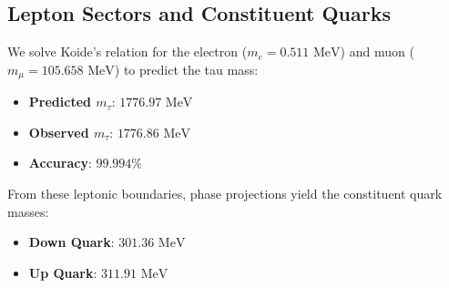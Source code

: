 \documentclass[11pt, twoside]{article}
\begin{document}
\begin{table}[H]
\centering
\caption{Hadronic Resonance Concordance Table}
\label{tab:hadron_concordance}
\end{table}

\subsection{Lepton Sectors and Constituent Quarks}
We solve Koide's relation for the electron (\(m_e = 0.511\text{ MeV}\)) and muon (\(m_\mu = 105.658\text{ MeV}\)) to predict the tau mass:
\begin{itemize}
    \item \textbf{Predicted \(m_\tau\)}: \textbf{\(1776.97\text{ MeV}\)}
    \item \textbf{Observed \(m_\tau\)}: \textbf{\(1776.86\text{ MeV}\)}
    \item \textbf{Accuracy}: \textbf{\(99.994\%\)}
\end{itemize}

From these leptonic boundaries, phase projections yield the constituent quark masses:
\begin{itemize}
    \item \textbf{Down Quark}: \textbf{\(301.36\text{ MeV}\)}
    \item \textbf{Up Quark}: \textbf{\(311.91\text{ MeV}\)}
\end{itemize}
\end{document}
